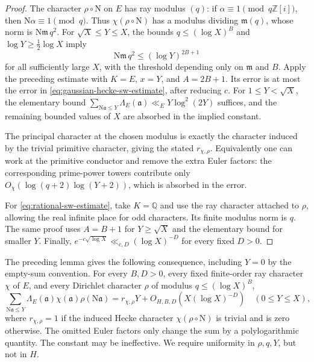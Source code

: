 \documentclass[11pt]{article}
\theoremstyle{definition}
\theoremstyle{remark}
\newcommand{\Q}{\mathbb Q}
\newcommand{\Z}{\mathbb Z}
\begin{document}
\begin{proof}
The character $\rho\circ\mathrm N$ on $E$ has ray modulus $(q)$:
if $\alpha\equiv1\pmod{q\Z[i]}$, then
$\mathrm N\alpha\equiv1\pmod q$.
Thus $\chi(\rho\circ\mathrm N)$ has a modulus dividing
$\mathfrak m(q)$, whose norm is $\mathrm N\mathfrak m\,q^2$.
For $\sqrt X\leq Y\leq X$, the bounds
$q\leq(\log X)^B$ and $\log Y\geq\frac12\log X$ imply
\[
 \mathrm N\mathfrak m\,q^2\leq(\log Y)^{2B+1}
\]
for all sufficiently large $X$, with the threshold depending only
on $\mathfrak m$ and $B$.
Apply the preceding estimate with $K=E$, $x=Y$, and $A=2B+1$.
Its error is at most the error in
\eqref{eq:gaussian-hecke-sw-estimate}, after reducing $c$.
For $1\leq Y<\sqrt X$, the elementary bound
$\sum_{\mathrm N\mathfrak a\leq Y}\Lambda_E(\mathfrak a)
\ll_E Y\log^2(2Y)$ suffices, and the remaining bounded values of
$X$ are absorbed in the implied constant.

The principal character at the chosen modulus is exactly the
character induced by the trivial primitive character, giving the
stated $r_{\chi,\rho}$.
Equivalently one can work at the primitive conductor and remove
the extra Euler factors: the corresponding prime-power towers
contribute only
$O_\chi(\log(q+2)\log(Y+2))$, which is absorbed in the error.

For \eqref{eq:rational-sw-estimate}, take $K=\Q$ and use the ray
character attached to $\rho$, allowing the real infinite place
for odd characters.  Its finite modulus norm is $q$.
The same proof uses $A=B+1$ for $Y\geq\sqrt X$ and the elementary
bound for smaller $Y$.  Finally,
$e^{-c\sqrt{\log X}}\ll_{c,D}(\log X)^{-D}$ for every fixed $D>0$.
\end{proof}


The preceding lemma gives the following consequence, including $Y=0$ by the empty-sum convention.
  For every $B,D>0$, every fixed finite-order
ray character $\chi$ of $E$, and every Dirichlet character $\rho$ of
modulus $q\leq(\log X)^B$,
\begin{equation}\label{eq:gaussian-hecke-sw-input}
 \sum_{\mathrm N\mathfrak a\leq Y}
       \Lambda_E(\mathfrak a)\chi(\mathfrak a)
                         \rho(\mathrm N\mathfrak a)
  = r_{\chi,\rho}Y+O_{H,B,D}(X(\log X)^{-D})
 \quad(0\leq Y\leq X),
\end{equation}
where $r_{\chi,\rho}=1$ if the induced Hecke character
$\chi(\rho\circ\mathrm N)$ is trivial and is zero otherwise.
The omitted Euler factors only change the sum by a polylogarithmic
quantity.  The constant may be ineffective.  We require uniformity in
$\rho,q,Y$, but not in $H$.
\end{document}
